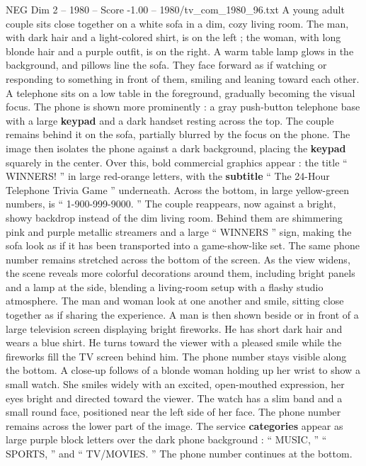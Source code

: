 \begin{textsample}{NEG Dim 2 – 1980 – Score -1.00 – 1980/tv\_com\_1980\_96.txt}  \label{ex:f2_neg_031}
A young adult couple sits close together on a white sofa in a dim, cozy living room.
The man, with dark hair and a light-colored shirt, is on the left ; the woman, with long blonde hair and a purple outfit, is on the right.
A warm table lamp glows in the background, and pillows line the sofa.
They face forward as if watching or responding to something in front of them, smiling and leaning toward each other.
A telephone sits on a low table in the foreground, gradually becoming the visual focus.
The phone is shown more prominently : a gray push-button telephone base with a large \textbf{keypad} and a dark handset resting across the top.
The couple remains behind it on the sofa, partially blurred by the focus on the phone.
The image then isolates the phone against a dark background, placing the \textbf{keypad} squarely in the center.
Over this, bold commercial graphics appear : the title “ WINNERS! ” in large red-orange letters, with the \textbf{subtitle} “ The 24-Hour Telephone Trivia Game ” underneath.
Across the bottom, in large yellow-green numbers, is “ 1-900-999-9000. ” The couple reappears, now against a bright, showy backdrop instead of the dim living room.
Behind them are shimmering pink and purple metallic streamers and a large “ WINNERS ” sign, making the sofa look as if it has been transported into a game-show-like set.
The same phone number remains stretched across the bottom of the screen.
As the view widens, the scene reveals more colorful decorations around them, including bright panels and a lamp at the side, blending a living-room setup with a flashy studio atmosphere.
The man and woman look at one another and smile, sitting close together as if sharing the experience.
A man is then shown beside or in front of a large television screen displaying bright fireworks.
He has short dark hair and wears a blue shirt.
He turns toward the viewer with a pleased smile while the fireworks fill the TV screen behind him.
The phone number stays visible along the bottom.
A close-up follows of a blonde woman holding up her wrist to show a small watch.
She smiles widely with an excited, open-mouthed expression, her eyes bright and directed toward the viewer.
The watch has a slim band and a small round face, positioned near the left side of her face.
The phone number remains across the lower part of the image.
The service \textbf{categories} appear as large purple block letters over the dark phone background : “ MUSIC, ” “ SPORTS, ” and “ TV/MOVIES. ” The phone number continues at the bottom.

\end{textsample}
